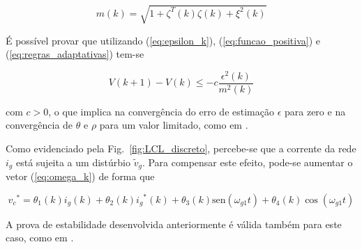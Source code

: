     \begin{equation}
        m(k) = \sqrt{1 + \zeta^T(k) \zeta(k) + \xi^2(k)}
    \end{equation}

    É possível provar que utilizando (\ref{eq:epsilon_k}), (\ref{eq:funcao_positiva})
    e (\ref{eq:regras_adaptativas}) tem-se

    \begin{equation}
        V(k + 1) - V(k) \leq -c \frac{\epsilon^2(k)}{m^2(k)}
    \end{equation}

    com $c > 0$, o que implica na convergência do erro de estimação $\epsilon$ para zero
    e na convergência de $\theta$ e $\rho$ para um valor limitado, como em \cite{ref:TAO}.

    Como evidenciado pela Fig.~\ref{fig:LCL_discreto}, percebe-se que a corrente da
    rede $i_g$ está sujeita a um distúrbio $\tilde{v}_g$. Para compensar este efeito,
    pode-se aumentar o vetor (\ref{eq:omega_k}) de forma que

    \begin{equation}
        {v_c}^* = \theta_1(k) i_g(k) + \theta_2(k) {i_g}^*(k)+
            \theta_3(k) \text{sen}(\omega_{g1}t) + \theta_4(k) \cos(\omega_{g1} t)
    \end{equation}

    A prova de estabilidade desenvolvida anteriormente é válida também para este caso,
    como em \cite{ref:TAO}.



